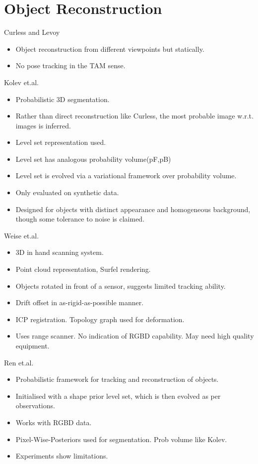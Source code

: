 \section{Object Reconstruction}
\label{sec:lit_review_obj_recon}
Curless and Levoy \cite{Curless1996}
\begin{itemize}
	\item Object reconstruction from different viewpoints but statically.
	\item No pose tracking in the TAM sense.
\end{itemize}

Kolev et.al. \cite{Kolev2006}
\begin{itemize}
	\item Probabilistic 3D segmentation.
	\item Rather than direct reconstruction like Curless, the most probable image w.r.t. images is inferred.
	\item Level set representation used.
	\item Level set has analogous probability volume(pF,pB)
	\item Level set is evolved via a variational framework over probability volume.
	\item Only evaluated on synthetic data.
	\item Designed for objects with distinct appearance and homogeneous background, though some tolerance to noise is claimed.
\end{itemize}

Weise et.al. \cite{Weise2009}
\begin{itemize}
	\item 3D in hand scanning system.
	\item Point cloud representation, Surfel rendering. \cite{Pfister2000}
	\item Objects rotated in front of a sensor, suggests limited tracking ability.
	\item Drift offset in as-rigid-as-possible manner. %
	\item ICP registration. Topology graph used for deformation.
	\item Uses range scanner. No indication of RGBD capability. May need high quality equipment.
\end{itemize}

Ren et.al. \cite{Ren2013}
\begin{itemize}
	\item Probabilistic framework for tracking and reconstruction of objects.
	\item Initialised with a shape prior level set, which is then evolved as per observations.
	\item Works with RGBD data.
	\item Pixel-Wise-Posteriors used for segmentation. Prob volume like Kolev. \cite{Bibby2008}
	\item Experiments show limitations.
\end{itemize}

